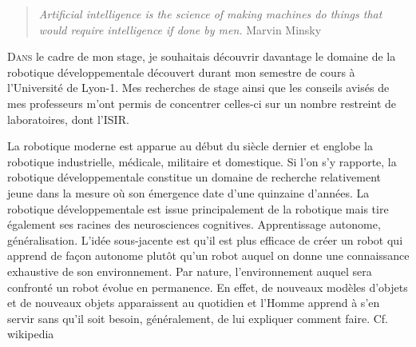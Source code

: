 \documentclass{llncs}
\begin{document}




 \begin{quotation}
  \textit{Artificial intelligence is the science of making machines do things that would require intelligence if done by men.} Marvin Minsky
 \end{quotation}

 
\lettrine{D}{ans} le cadre de mon stage, je souhaitais découvrir davantage le domaine de la robotique développementale découvert durant mon semestre de cours à l'Université de Lyon-1. Mes recherches de stage ainsi que les conseils avisés de mes professeurs m'ont permis de concentrer celles-ci sur un nombre restreint de laboratoires, dont l'ISIR.

La robotique moderne est apparue au début du siècle dernier et englobe la robotique industrielle, médicale, militaire et domestique. Si l'on s'y rapporte, la robotique développementale constitue un domaine de recherche relativement jeune dans la mesure où son émergence date d'une quinzaine d'années. La robotique développementale est issue principalement de la robotique mais tire également ses racines des neurosciences cognitives.
Apprentissage autonome, généralisation.
L'idée sous-jacente est qu'il est plus efficace de créer un robot qui apprend de façon autonome plutôt qu'un robot auquel on donne une connaissance exhaustive de son environnement. Par nature, l'environnement auquel sera confronté un robot évolue en permanence. En effet, de nouveaux modèles d'objets et de nouveaux objets apparaissent au quotidien et l'Homme apprend à s'en servir sans qu'il soit besoin, généralement, de lui expliquer comment faire.
Cf. wikipedia
\end{document}
